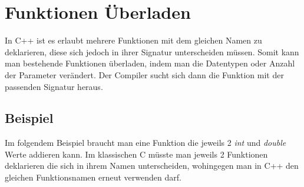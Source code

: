 \documentclass[MES,Master,ngerman]{twbook}%
\begin{document}
\newpage
\section{Funktionen Überladen}
In C++ ist es erlaubt mehrere Funktionen mit dem gleichen Namen zu deklarieren, diese sich jedoch in ihrer Signatur unterscheiden müssen. Somit kann man bestehende Funktionen überladen, indem man die Datentypen oder Anzahl der Parameter verändert. Der Compiler sucht sich dann die Funktion mit der passenden Signatur heraus. 
\subsection{Beispiel} \label{beispiel:1}
Im folgendem Beispiel braucht man eine Funktion die jeweils 2 \textit{int} und \textit{double} Werte addieren kann. Im klassischen C müsste man jeweils 2 Funktionen deklarieren die sich in ihrem Namen unterscheiden, wohingegen man in C++ den gleichen Funktionsnamen erneut verwenden darf.
\begin{figure}[!htb]
	\begin{subfigure}[b]{0.5\textwidth}
		
		\label{fig:1}
	\end{subfigure}
	\begin{subfigure}[b]{0.5\textwidth}
		
		\label{fig:2}
	\end{subfigure}
\end{figure}
\end{document}
